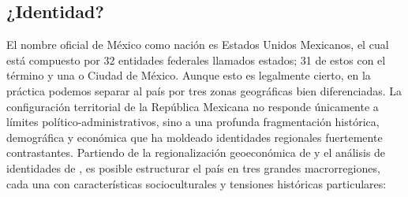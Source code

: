 \subsection{¿Identidad?}
\label{ssec:identidad}

El nombre oficial de México como nación es Estados Unidos Mexicanos, el cual está compuesto por 32 entidades federales llamados
estados; 31 de estos con el término  y una  o
Ciudad de México. Aunque esto es legalmente cierto, en la práctica podemos separar al país por tres zonas
geográficas bien diferenciadas. La configuración territorial de la República Mexicana no responde únicamente a
límites político-administrativos, sino a una profunda fragmentación histórica, demográfica y económica que ha
moldeado identidades regionales fuertemente contrastantes. Partiendo de la regionalización geoeconómica de
\cite{bassols1992mexico} y el análisis de identidades de \cite{gimenez2007estudios}, es posible
estructurar el país en tres grandes macrorregiones, cada una con características socioculturales
y tensiones históricas particulares:

